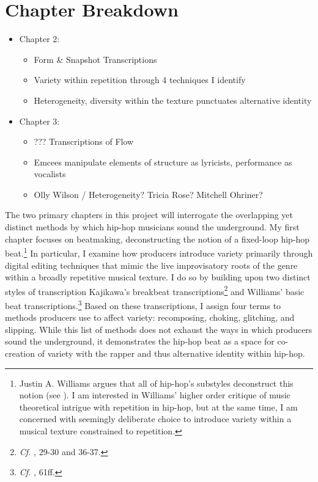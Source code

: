 \section{Chapter Breakdown}
\begin{itemize}
    \item Chapter 2: 
        \begin{itemize}
            \item Form \& Snapshot Transcriptions
            \item Variety within repetition through 4 techniques I identify
            \item Heterogeneity, diversity within the texture punctuates alternative identity
        \end{itemize}
    \item Chapter 3:
        \begin{itemize}
            \item ??? Transcriptions of Flow
            \item Emcees manipulate elements of structure as lyricists, performance as vocalists
            \item Olly Wilson / Heterogeneity? Tricia Rose? Mitchell Ohriner?
        \end{itemize}
\end{itemize}

The two primary chapters in this project will interrogate the overlapping yet distinct methods
by which hip-hop musicians sound the underground. My first chapter focuses on beatmaking, deconstructing 
the notion of a fixed-loop hip-hop beat.\footnote{Justin A. Williams argues that all of hip-hop's 
substyles deconstruct this notion (see \cite{justinawilliamsBeatsFlowsResponse2009}). I am interested 
in Williams' higher order critique of music theoretical intrigue with repetition in hip-hop, but at 
the same time, I am concerned with seemingly deliberate choice to introduce variety within a musical 
texture constrained to repetition.} In particular, I examine how producers introduce variety primarily
through digital editing techniques that mimic the live improvisatory roots of the genre within a broadly
repetitive musical texture. I do so by building upon two distinct styles of transcription\textemdash
Kajikawa's breakbeat  transcriptions\footnote{\textit{Cf.} \cite{lorenkajikawaSoundingRaceRap2015}, 29-30 
and 36-37.} and Williams' basic beat transcriptions.\footnote{\textit{Cf.}
\cite{justinawilliamsRhyminStealinMusical2013}, 61ff.} Based on these transcriptions, I assign four 
terms to methods producers use to affect variety: recomposing, choking, glitching, and slipping. While 
this list of methods does not exhaust the ways in which producers sound the underground, it demonstrates 
the hip-hop beat as a space for co-creation of variety with the rapper and thus alternative identity 
within hip-hop.

